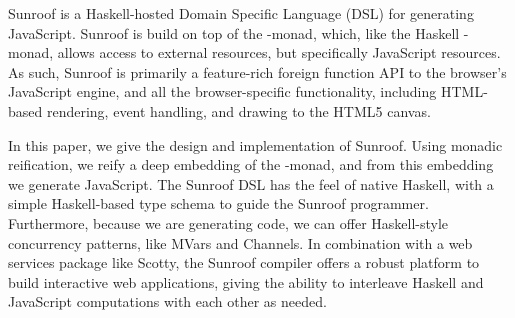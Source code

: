  
Sunroof is a Haskell-hosted Domain Specific Language (DSL) for generating JavaScript.
Sunroof is build on top of the \JS-monad, which, like the Haskell \IO-monad, allows 
access to external resources, but specifically JavaScript
resources. As such, Sunroof is primarily a feature-rich foreign
function API to the browser's JavaScript engine, and all the browser-specific
functionality, including HTML-based rendering, event handling, and 
drawing to the HTML5 canvas. 

In this paper, we give the design and implementation of Sunroof.
Using monadic reification, we reify a deep embedding of the \JS-monad,
and from this embedding we generate JavaScript.
The Sunroof DSL has the feel of native Haskell, with a simple
Haskell-based type schema to guide the Sunroof programmer.
Furthermore, because we are generating code,
we can offer Haskell-style concurrency patterns, like MVars and Channels.
In combination with a web services package like Scotty,
the Sunroof compiler offers a robust platform to build interactive web applications,
giving the ability to interleave Haskell and JavaScript computations
with each other as needed.